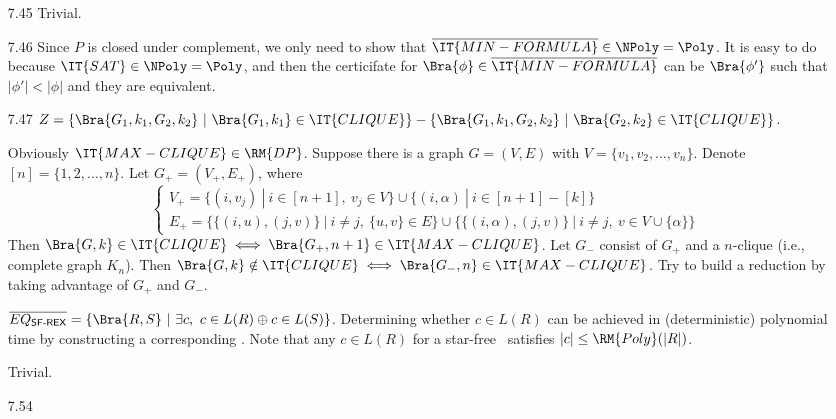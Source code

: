 \begin{itemize}
	\item[7.45]
	Trivial.
	
	\item[7.46]
	Since $P$ is closed under complement, we only need to show that $\overline{\IT{MIN-FORMULA}} \in \NPoly = \Poly$. It is easy to do because $\IT{SAT} \in \NPoly = \Poly$, and then the certicifate for $\Bra{\phi} \in \overline{\IT{MIN-FORMULA}}$ can be $\Bra{\phi'}$ such that $|\phi'| < |\phi|$ and they are equivalent.
	
	\item[7.47]
	$Z = \{ \Bra{G_1, k_1, G_2, k_2} \ | \ \Bra{G_1, k_1} \in \IT{CLIQUE} \} - \{ \Bra{G_1, k_1, G_2, k_2} \ | \ \Bra{G_2, k_2} \in \IT{CLIQUE} \} $.
	
	\item[\Star 7.48]
	Obviously $\IT{MAX-CLIQUE} \in \RM{DP}$. Suppose there is a graph $G = (V, E)$ with $V = \{v_1, v_2, \dots, v_n \}$. Denote $[n] = \{1, 2, \dots, n\}$. Let $G_+ = (V_+, E_+)$, where
	$$
		\left\{
			\begin{array}{l}
				\displaystyle
				V_+ = \{ (i, v_j) \ | \ i \in [n + 1],\ v_j \in V \} \cup \{ (i, \alpha) \ | \ i \in [n+1] - [k] \} \\
				E_+ = \{ \{ (i, u), (j, v) \} \ | \ i \neq j,\ \{u, v\} \in E \} \cup \{ \{ (i, \alpha), (j, v) \} \ | \ i \neq j,\ v \in V \cup \{\alpha\} \}
			\end{array}
		\right.
	$$
	Then $\Bra{G, k} \in \IT{CLIQUE} \iff \Bra{G_+, n+1} \in \IT{MAX-CLIQUE}$. Let $G_-$ consist of $G_+$ and a $n$-clique (i.e., complete graph $K_n$). Then $\Bra{G, k} \notin \IT{CLIQUE} \iff \Bra{G_-, n} \in \IT{MAX-CLIQUE}$. Try to build a reduction by taking advantage of $G_+$ and $G_-$.
	
	\item[\Star 7.49]
	\Empty
	
	\item[\Star 7.50] 
	$\overline{EQ_{\textsf{SF-REX}}} = \{ \Bra{R, S} \ | \ \exists c,\ c \in L(R) \oplus c \in L(S) \}$. Determining whether $c \in L(R)$ can be achieved in (deterministic) polynomial time by constructing a corresponding \NFA . Note that any $c \in L(R)$ for a star-free \REX\ satisfies $|c| \leq \RM{Poly}(|R|)$.
	
	\item[\Star 7.51] 
	Trivial.
	
	\item[\Star 7.52]
	\Empty
	
	\item[\Star 7.53]
	\Empty
	
	\item[7.54]
	\Empty
	
\end{itemize}
